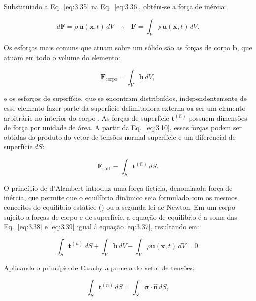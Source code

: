 \indent Substituindo a Eq.~\ref{eq:3.35} na Eq.~\ref{eq:3.36}, obtém-se a força de inércia: 

\begin{equation}
    d\mathbf{F} = \rho \,\ddot{\mathbf{u}}(\mathbf{x},t)\, dV \quad \therefore \quad \mathbf{F} = \int_V \rho \,\ddot{\mathbf{u}}(\mathbf{x},t)\, dV.
    \label{eq:3.37}
\end{equation}

\indent Os esforços mais comuns que atuam sobre um sólido são as forças de corpo $\mathbf{b}$, que atuam em todo o volume do elemento: 

\begin{equation}
    \mathbf{F}_{\text{corpo}} = \int_V \mathbf{b} \, dV,
    \label{eq:3.38}
\end{equation}

	
e os esforços de superfície, que se encontram distribuídos, independentemente de esse elemento fazer parte da superfície delimitadora externa ou ser um elemento arbitrário no interior do corpo \citet{continuummechanicsengineers2010}. As forças de superfície $\mathbf{t}^{(\hat{n})}$ possuem dimensões de força por unidade de área. A partir da Eq.~\ref{eq:3.10}, essas forças podem ser obtidas do produto do vetor de tensões normal superfície e um diferencial de superfície $dS$:
	
\begin{equation}
    \mathbf{F}_{\text{surf}} = \int_S \mathbf{t}^{(\hat{n})} \, dS.
    \label{eq:3.39}
\end{equation}


\indent O princípio de d'Alembert introduz uma força fictícia, denominada força de inércia, que permite que o equilíbrio dinâmico seja formulado com os mesmos conceitos do equilíbrio estático (\citet{introductionfiniteelementvibrationanalysis2010}) ou a segunda lei de Newton. Em um corpo sujeito a forças de corpo e de superfície, a equação de equilíbrio é a soma das Eq.~\ref{eq:3.38} e \ref{eq:3.39} igual à equação \ref{eq:3.37}, resultando em:

\begin{equation}
    \int_S \mathbf{t}^{(\hat{n})} \, dS + \int_V \mathbf{b} \, dV - \int_V \rho \ddot{\mathbf{u}}(\mathbf{x},t) \, dV = 0.
    \label{eq:3.40}
\end{equation}


\indent Aplicando o princípio de Cauchy a parcelo do vetor de tensões:

\begin{equation}
    \int_S \mathbf{t}^{(\hat{n})} \, dS = \int_S \boldsymbol{\sigma} \cdot \hat{\mathbf{n}} \, dS,
    \label{eq:3.41}
\end{equation}


